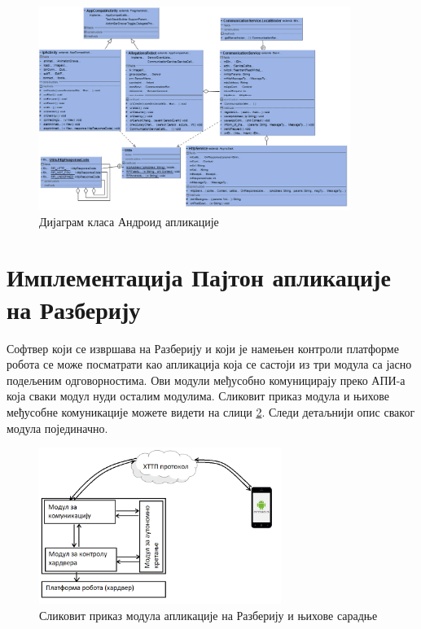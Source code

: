 \documentclass[12pt,oneside]{memoir}
\theoremstyle{remark}
\begin{document}
\begin{figure}[!ht]
\centering
\includegraphics[width=0.9\textwidth]{slike/dijagramklasa.png}
\caption{Дијаграм класа Андроид апликације}
\label{fig:dijagramklasaapp}
\end{figure}

\section{Имплементација Пајтон апликације на Разберију}
Софтвер који се извршава на Разберију и који је намењен контроли платформе робота се може посматрати као апликација која се састоји из три модула са јасно подељеним одговорностима. Ови модули међусобно комуницирају преко АПИ-а која сваки модул нуди осталим модулима. Сликовит приказ модула и њихове међусобне комуникације можете видети на слици \ref{fig:rpisoftvare}.
Следи детаљнији опис сваког модула појединачно.
\begin{figure}[!ht]
\centering
\includegraphics[width=0.7\textwidth]{slike/rpisoftvers.png}
\caption{Сликовит приказ модула апликације на Разберију и њихове сарадње}
\label{fig:rpisoftvare}
\end{figure}
\end{document}
